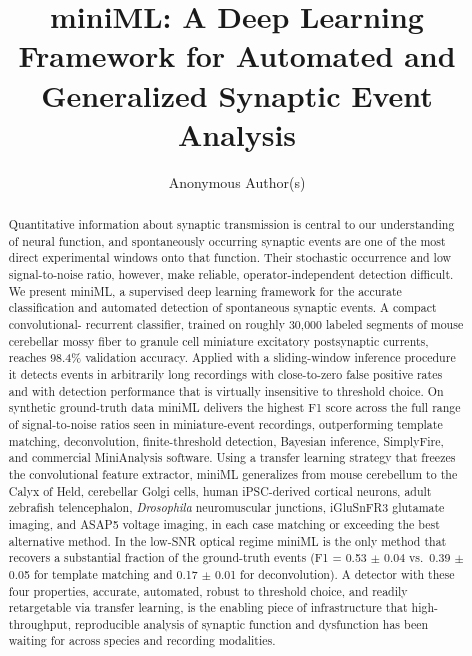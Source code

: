 \documentclass[11pt]{article}
\title{\textbf{miniML: A Deep Learning Framework for Automated and Generalized Synaptic Event Analysis}}
\author[1]{Anonymous Author(s)}
\affil[1]{For submission to \textit{eLife}}
\date{}
\begin{document}
\maketitle
\linenumbers

\begin{abstract}
\noindent
Quantitative information about synaptic transmission is central to our
understanding of neural function, and spontaneously occurring synaptic events
are one of the most direct experimental windows onto that function. Their
stochastic occurrence and low signal-to-noise ratio, however, make
reliable, operator-independent detection difficult. We present miniML, a
supervised deep learning framework for the accurate classification and
automated detection of spontaneous synaptic events. A compact convolutional-
recurrent classifier, trained on roughly 30{,}000 labeled segments of mouse
cerebellar mossy fiber to granule cell miniature excitatory postsynaptic
currents, reaches 98.4\% validation accuracy. Applied with a sliding-window
inference procedure it detects events in arbitrarily long recordings with
close-to-zero false positive rates and with detection performance that is
virtually insensitive to threshold choice. On synthetic ground-truth data
miniML delivers the highest F1 score across the full range of signal-to-noise
ratios seen in miniature-event recordings, outperforming template matching,
deconvolution, finite-threshold detection, Bayesian inference, SimplyFire, and
commercial MiniAnalysis software. Using a transfer learning strategy that
freezes the convolutional feature extractor, miniML generalizes from mouse
cerebellum to the Calyx of Held, cerebellar Golgi cells, human iPSC-derived
cortical neurons, adult zebrafish telencephalon, \textit{Drosophila}
neuromuscular junctions, iGluSnFR3 glutamate imaging, and ASAP5 voltage
imaging, in each case matching or exceeding the best alternative method. In
the low-SNR optical regime miniML is the only method that recovers a
substantial fraction of the ground-truth events (F1 = 0.53 $\pm$ 0.04 vs.\
0.39 $\pm$ 0.05 for template matching and 0.17 $\pm$ 0.01 for deconvolution).
A detector with these four properties, accurate, automated, robust to
threshold choice, and readily retargetable via transfer learning, is the
enabling piece of infrastructure that high-throughput, reproducible
analysis of synaptic function and dysfunction has been waiting for across
species and recording modalities.
\end{abstract}

\end{document}
